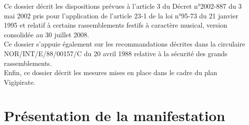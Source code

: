 \documentclass[hidelinks, paper=a4, fontsize=13pt]{report}
\begin{document}
Ce dossier décrit les dispositions prévues à l’article 3 du Décret n°2002-887 du 3 mai 2002 pris pour l’application de l’article 23-1 de la loi n°95-73 du 21 janvier 1995 et relatif à certains rassemblements festifs à caractère musical, version consolidée au 30 juillet 2008.\\

Ce dossier s’appuie également sur les recommandations décrites dans la circulaire NOR/INT/E/88/00157/C du 20 avril 1988 relative à la sécurité des grands rassemblements. \\

Enfin, ce dossier décrit les mesures mises en place dans le cadre du plan Vigipirate.

\newpage

\section{Présentation de la manifestation}
\end{document}
